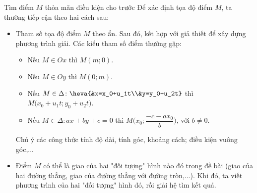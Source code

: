 \begin{dang}{Tìm điểm $M$ thỏa mãn điều kiện cho trước}
	Để xác định tọa độ điểm $M$, ta thường tiếp cận theo hai cách sau:
	\begin{itemize}
		\item [\iconMT]  Tham số tọa độ điểm $M$ theo ẩn. Sau đó, kết hợp với giả thiết để xây dựng phương trình giải. Các kiểu tham số điểm thường gặp:
		\begin{tcolorbox}[colframe=orange,colback=red!2!white,boxrule=0.2mm]
				\begin{itemize}
				\item Nếu $M \in Ox$ thì $M(m;0)$.
				\item Nếu $M \in Oy$ thì $M(0;m)$.
				\item Nếu $M \in \Delta \colon \heva{&x=x_0+u_1t\\&y=y_0+u_2t}$ thì $M\bigg(x_0+u_1t;y_0+u_2t\bigg)$.
				\item Nếu $M \in \Delta \colon ax+by+c=0$ thì $M\bigg(x_0;\dfrac{-c-ax_0}{b}\bigg)$, với $b \ne 0$.
			\end{itemize}
		\end{tcolorbox}
	\begin{luuy}
		Chú ý các công thức tính độ dài, tính góc, khoảng cách; điều kiện vuông góc,...
	\end{luuy}
		\item [\iconMT]  Điểm $M$ có thể là giao của hai "đối tượng" hình nào đó trong đề bài (giao của hai đường thẳng, giao của đường thẳng với đường tròn,...). Khi đó, ta viết phương trình của hai "đối tượng" hình đó, rồi giải hệ tìm kết quả.
	\end{itemize}
\end{dang}

